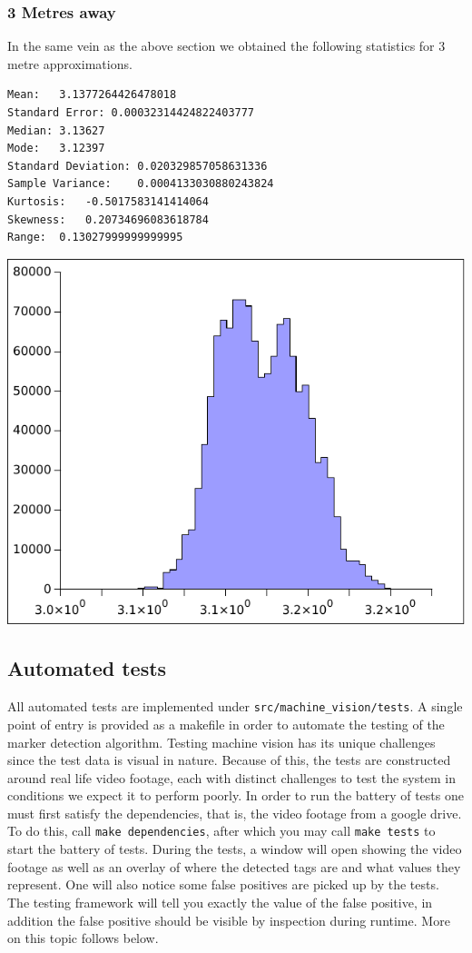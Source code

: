 \subsubsection{3 Metres away}
In the same vein as the above section we obtained the following statistics for 3 metre approximations.
\begin{verbatim}
Mean:	3.1377264426478018
Standard Error:	0.00032314424822403777
Median:	3.13627
Mode:	3.12397
Standard Deviation:	0.020329857058631336
Sample Variance:	0.0004133030880243824
Kurtosis:	-0.5017583141414064
Skewness:	0.20734696083618784
Range:	0.13027999999999995
\end{verbatim}
\par
\includegraphics[]{machine_vision/data/3metres.pdf}
\subsection{Automated tests}
All automated tests are implemented under \verb|src/machine_vision/tests|. A single point of entry is provided as a makefile in order to automate the testing of the marker detection algorithm. Testing machine vision has its unique challenges since the test data is visual in nature. Because of this, the tests are constructed around real life video footage, each with distinct challenges to test the system in conditions we expect it to perform poorly. In order to run the battery of tests one must first satisfy the dependencies, that is, the video footage from a google drive. To do this, call \verb|make dependencies|, after which you may call \verb|make tests| to start the battery of tests. During the tests, a window will open showing the video footage as well as an overlay of where the detected tags are and what values they represent. One will also notice some false positives are picked up by the tests. The testing framework will tell you exactly the value of the false positive, in addition the false positive should be visible by inspection during runtime. More on this topic follows below.

